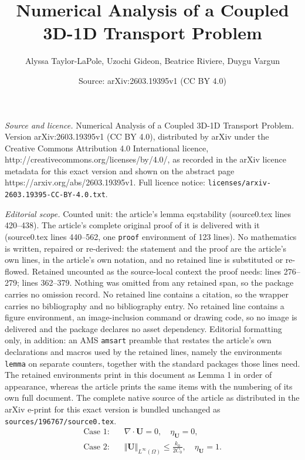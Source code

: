 \documentclass[10pt,a4paper]{amsart}
\title{Numerical Analysis of a Coupled 3D-1D Transport Problem}
\author{Alyssa Taylor-LaPole, Uzochi Gideon, Beatrice Riviere, Duygu Vargun}
\date{Source: arXiv:2603.19395v1 (CC BY 4.0)}
\newcommand{\bfU}{{\boldsymbol U}}
\begin{document}
\maketitle

\noindent\emph{Source and licence.} Numerical Analysis of a Coupled 3D-1D Transport Problem. Version arXiv:2603.19395v1 (CC BY 4.0), distributed by arXiv under the Creative Commons Attribution 4.0 International licence, http://creativecommons.org/licenses/by/4.0/, as recorded in the arXiv licence metadata for this exact version and shown on the abstract page https://arxiv.org/abs/2603.19395v1. Full licence notice: \texttt{licenses/arxiv-2603.19395-CC-BY-4.0.txt}.\par\smallskip

\noindent\textit{Editorial scope.} Counted unit: the article's lemma eq:stability (source0.tex lines 420--438). The article's complete original proof of it is delivered with it (source0.tex lines 440--562, one \texttt{proof} environment of 123 lines). No mathematics is written, repaired or re-derived: the statement and the proof are the article's own lines, in the article's own notation, and no retained line is substituted or re-flowed.  Retained uncounted as the source-local context the proof needs: lines 276--279; lines 362--379.  Nothing was omitted from any retained span, so the package carries no omission record.  No retained line contains a citation, so the wrapper carries no bibliography and no bibliography entry.  No retained line contains a figure environment, an image-inclusion command or drawing code, so no image is delivered and the package declares no asset dependency.  Editorial formatting only, in addition: an AMS \texttt{amsart} preamble that restates the article's own declarations and macros used by the retained lines, namely the environments \texttt{lemma} on separate counters, together with the standard packages those lines need.  The retained environments print in this document as Lemma 1 in order of appearance, whereas the article prints the same items with the numbering of its own full document.  The complete native source of the article as distributed in the arXiv e-print for this exact version is bundled unchanged as \texttt{sources/196767/source0.tex}.
    \begin{align}
    \mbox{Case 1:}&\quad \nabla \cdot \bfU = 0, \quad \eta_\bfU = 0,\\
    \mbox{Case 2:}&\quad \Vert \bfU \Vert_{L^\infty(\Omega)} \leq \frac{k_0}{2 C_0}, \quad \eta_\bfU = 1.\label{eq:condU}
    \end{align}
\end{document}
